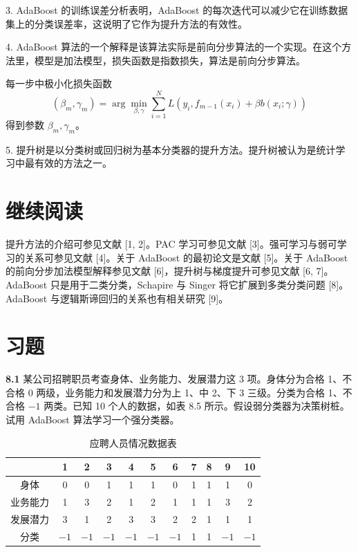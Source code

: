 \documentclass[UTF8, 12pt, fontset=fandol, oneside]{ctexart}
\begin{document}
3. AdaBoost 的训练误差分析表明，AdaBoost 的每次迭代可以减少它在训练数据集上的分类误差率，这说明了它作为提升方法的有效性。

4. AdaBoost 算法的一个解释是该算法实际是前向分步算法的一个实现。在这个方法里，模型是加法模型，损失函数是指数损失，算法是前向分步算法。

每一步中极小化损失函数
\[
(\beta_m,\gamma_m)=\arg\min_{\beta,\gamma}\sum_{i=1}^N
L(y_i,f_{m-1}(x_i)+\beta b(x_i;\gamma))
\]
得到参数 $\beta_m,\gamma_m$。

5. 提升树是以分类树或回归树为基本分类器的提升方法。提升树被认为是统计学习中最有效的方法之一。

\section*{继续阅读}

提升方法的介绍可参见文献 [1, 2]。PAC 学习可参见文献 [3]。强可学习与弱可学习的关系可参见文献 [4]。关于 AdaBoost 的最初论文是文献 [5]。关于 AdaBoost 的前向分步加法模型解释参见文献 [6]，提升树与梯度提升可参见文献 [6, 7]。AdaBoost 只是用于二类分类，Schapire 与 Singer 将它扩展到多类分类问题 [8]。AdaBoost 与逻辑斯谛回归的关系也有相关研究 [9]。

\section*{习题}

\noindent\textbf{8.1}\quad
某公司招聘职员考查身体、业务能力、发展潜力这 3 项。身体分为合格 1、不合格 0 两级，业务能力和发展潜力分为上 1、中 2、下 3 三级。分类为合格 1、不合格 $-1$ 两类。已知 10 个人的数据，如表 8.5 所示。假设弱分类器为决策树桩。试用 AdaBoost 算法学习一个强分类器。

\begin{table}[htbp]
\centering
\caption{应聘人员情况数据表}
\begin{tabular}{c*{10}{c}}
\toprule
 & 1 & 2 & 3 & 4 & 5 & 6 & 7 & 8 & 9 & 10\\
\midrule
身体 & 0 & 0 & 1 & 1 & 1 & 0 & 1 & 1 & 1 & 0\\
业务能力 & 1 & 3 & 2 & 1 & 2 & 1 & 1 & 1 & 3 & 2\\
发展潜力 & 3 & 1 & 2 & 3 & 3 & 2 & 2 & 1 & 1 & 1\\
分类 & $-1$ & $-1$ & $-1$ & $-1$ & $-1$ & $-1$ & 1 & 1 & $-1$ & $-1$\\
\bottomrule
\end{tabular}
\end{table}
\end{document}
